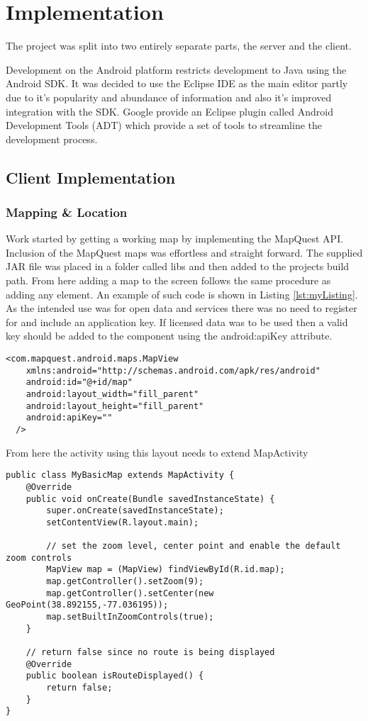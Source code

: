 \chapter{Implementation}
The project was split into two entirely separate parts, the server and the client. 

Development on the Android platform restricts development to Java using the Android SDK. It was decided to use the Eclipse IDE as the main editor partly due to it's popularity and abundance of information and also it's improved integration with the SDK. Google provide an Eclipse plugin called Android Development Tools (ADT) which provide a set of tools to streamline the development process. 


\section{Client Implementation}


\subsection{Mapping \& Location}
Work started by getting a working map by implementing the MapQuest API. Inclusion of the MapQuest maps was effortless and straight forward. The supplied JAR file was placed in a folder called libs and then added to the projects build path. From here adding a map to the screen follows the same procedure as adding any element. An example of such code is shown in Listing \ref{lst:myListing}. As the intended use was for open data and services there was no need to register for and include an application key. If licensed data was to be used then a valid key should be added to the component using the android:apiKey attribute.

\begin{lstlisting}[caption={Basic MapQuest usage (Adapted from \cite{mapquest_example})},label={lst:myListing}]
<com.mapquest.android.maps.MapView
    xmlns:android="http://schemas.android.com/apk/res/android"
    android:id="@+id/map"
    android:layout_width="fill_parent"
    android:layout_height="fill_parent"
    android:apiKey=""
  />
\end{lstlisting}

From here the activity using this layout needs to extend MapActivity

\begin{lstlisting}[caption={Basic MapQuest usage (Adapted from \cite{mapquest_example})},label={lst:myListing2}]
public class MyBasicMap extends MapActivity {
	@Override
	public void onCreate(Bundle savedInstanceState) {
		super.onCreate(savedInstanceState);
		setContentView(R.layout.main);

		// set the zoom level, center point and enable the default zoom controls 
		MapView map = (MapView) findViewById(R.id.map);
		map.getController().setZoom(9);
		map.getController().setCenter(new GeoPoint(38.892155,-77.036195));
		map.setBuiltInZoomControls(true);
	}

	// return false since no route is being displayed 
	@Override
	public boolean isRouteDisplayed() {
		return false;
	}
}
\end{lstlisting}

